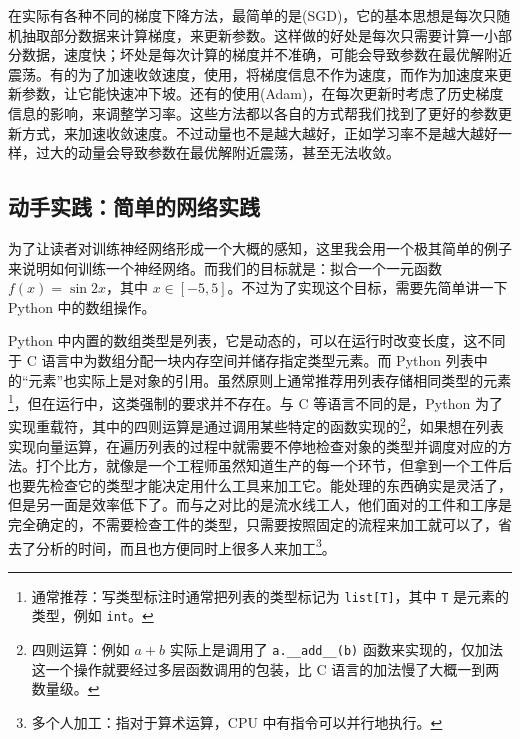 在实际有各种不同的梯度下降方法，最简单的是(SGD)，它的基本思想是每次只随机抽取部分数据来计算梯度，来更新参数。这样做的好处是每次只需要计算一小部分数据，速度快；坏处是每次计算的梯度并不准确，可能会导致参数在最优解附近震荡。有的为了加速收敛速度，使用，将梯度信息不作为速度，而作为加速度来更新参数，让它能快速冲下坡。还有的使用(Adam)，在每次更新时考虑了历史梯度信息的影响，来调整学习率。这些方法都以各自的方式帮我们找到了更好的参数更新方式，来加速收敛速度。不过动量也不是越大越好，正如学习率不是越大越好一样，过大的动量会导致参数在最优解附近震荡，甚至无法收敛。

\newpage

\subsection*{动手实践：简单的网络实践}

为了让读者对训练神经网络形成一个大概的感知，这里我会用一个极其简单的例子来说明如何训练一个神经网络。而我们的目标就是：拟合一个一元函数 $f(x) = \sin 2x$，其中 $x \in [-5, 5]$。不过为了实现这个目标，需要先简单讲一下 Python 中的数组操作。

Python 中内置的数组类型是列表，它是动态的，可以在运行时改变长度，这不同于 C 语言中为数组分配一块内存空间并储存指定类型元素。而 Python 列表中的“元素”也实际上是对象的引用。虽然原则上通常推荐用列表存储相同类型的元素\footnote{通常推荐：写类型标注时通常把列表的类型标记为 \texttt{list[T]}，其中 \texttt{T} 是元素的类型，例如 \texttt{int}。}，但在运行中，这类强制的要求并不存在。与 C 等语言不同的是，Python 为了实现重载符，其中的四则运算是通过调用某些特定的函数实现的\footnote{四则运算：例如 $a + b$ 实际上是调用了 \texttt{a.\_\_add\_\_(b)} 函数来实现的，仅加法这一个操作就要经过多层函数调用的包装，比 C 语言的加法慢了大概一到两数量级。}，如果想在列表实现向量运算，在遍历列表的过程中就需要不停地检查对象的类型并调度对应的方法。打个比方，就像是一个工程师虽然知道生产的每一个环节，但拿到一个工件后也要先检查它的类型才能决定用什么工具来加工它。能处理的东西确实是灵活了，但是另一面是效率低下了。而与之对比的是流水线工人，他们面对的工件和工序是完全确定的，不需要检查工件的类型，只需要按照固定的流程来加工就可以了，省去了分析的时间，而且也方便同时上很多人来加工\footnote{多个人加工：指对于算术运算，CPU 中有指令可以并行地执行。}。

